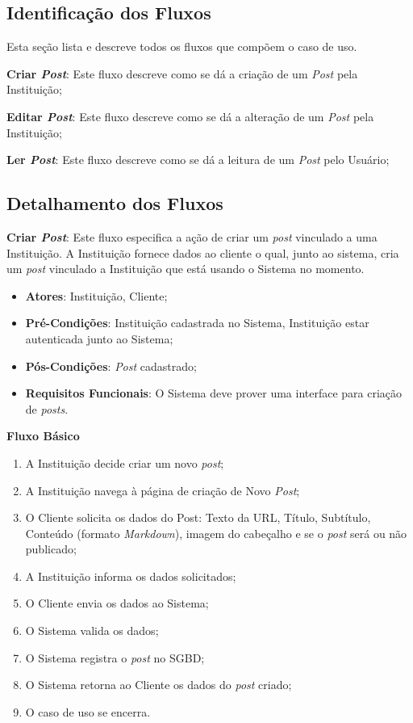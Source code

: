 \begin{anexosenv}
\subsection*{Identificação dos Fluxos}
Esta seção lista e descreve todos os fluxos que compõem o caso de uso.
\begin{lista}
  \item \textbf{Criar \emph{Post}}: Este fluxo descreve como se dá a criação de um \emph{Post} pela Instituição;
  \item \textbf{Editar \emph{Post}}: Este fluxo descreve como se dá a alteração de um \emph{Post} pela Instituição;
  \item \textbf{Ler \emph{Post}}: Este fluxo descreve como se dá a leitura de um \emph{Post} pelo Usuário;
\end{lista}

\subsection*{Detalhamento dos Fluxos}
\begin{lista}
  \item \textbf{Criar \emph{Post}}: Este fluxo especifica a ação de criar um \emph{post} vinculado a uma Instituição. A Instituição fornece dados ao cliente o qual, junto ao sistema, cria um \emph{post} vinculado a Instituição que está usando o Sistema no momento.
    \begin{itemize}
    \item \textbf{Atores}: Instituição, Cliente;
    \item \textbf{Pré-Condições}: Instituição cadastrada no Sistema, Instituição estar autenticada junto ao Sistema;
    \item \textbf{Pós-Condições}: \emph{Post} cadastrado;
    \item \textbf{Requisitos Funcionais}: O Sistema deve prover uma interface para criação de \emph{posts}.
    \end{itemize}
	
    \textbf{Fluxo Básico}
    \begin{enumerate}
    \item A Instituição decide criar um novo \emph{post};
    \item A Instituição navega à página de criação de Novo \emph{Post};
    \item O Cliente solicita os dados do Post: Texto da URL, Título, Subtítulo, Conteúdo (formato \emph{Markdown}), imagem do cabeçalho e se o \emph{post} será ou não publicado;
    \item A Instituição informa os dados solicitados;
    \item O Cliente envia os dados ao Sistema;
    \item O Sistema valida os dados;
    \item O Sistema registra o \emph{post} no SGBD;
    \item O Sistema retorna ao Cliente os dados do \emph{post} criado;
    \item O caso de uso se encerra.
    \end{enumerate}
    

\end{lista}
\end{anexosenv}
